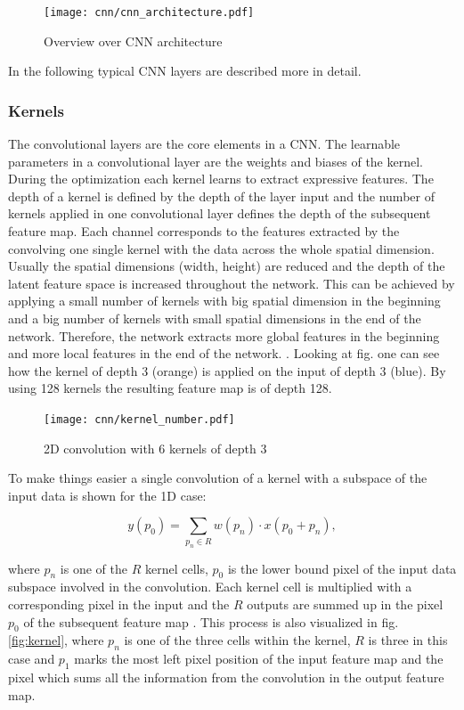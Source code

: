 \begin{figure}[htpb]
  \centering
  \texttt{[image: cnn/cnn\_architecture.pdf]}
  \caption {Overview over CNN architecture \cite{OShea2015}}
  \label{fig:CNN_overview}
\end{figure}

In the following typical CNN layers are described more in detail. 


\subsubsection{Kernels}
The convolutional layers are the core elements in a CNN. The learnable parameters in a convolutional layer are the weights and biases of the kernel. During the optimization each kernel learns to extract expressive features. The depth of a kernel is defined by the depth of the layer input and the number of kernels applied in one convolutional layer defines the depth of the subsequent feature map. Each channel corresponds to the features extracted by the convolving one single kernel with the data across the whole spatial dimension. Usually the spatial dimensions (width, height) are reduced and the depth of the latent feature space is increased throughout the network. This can be achieved by applying a small number of kernels with big spatial dimension in the beginning and a big number of kernels with small spatial dimensions in the end of the network. Therefore, the network extracts more global features in the beginning and more local features in the end of the network.  \cite{OShea2015}. Looking at fig. \label{fig:kernel_number} one can see how the kernel of depth 3 (orange) is applied on the input of depth 3 (blue). By using 128 kernels the resulting feature map is of depth 128.

\begin{figure}[htpb]
  \centering
  \texttt{[image: cnn/kernel\_number.pdf]}
  \caption {2D convolution with 6 kernels of depth 3 \cite{Ganesh2019}}
  \label{fig:kernel_number}
\end{figure}
\FloatBarrier 

To make things easier a single convolution of a kernel with a subspace of the input data is shown for the 1D case:

\begin{equation}
  y(p_{0}) = \sum_{p_{n} \in R} w(p_{n}) \cdot x(p_{0} + p_{n}), 
  \label{eq:kernel}
\end{equation}

where $p_{n}$ is one of the $R$ kernel cells, $p_{0}$ is the lower bound pixel of the input data subspace involved in the convolution. Each kernel cell is multiplied with a corresponding pixel in the input and the $R$ outputs are summed up in the pixel $p_{0}$ of the subsequent feature map \cite{Ganesh2019}. This process is also visualized in fig. \ref{fig:kernel}, where $p_{n}$ is one of the three cells within the kernel, $R$ is three in this case and $p_{1}$ marks the most left pixel position of the input feature map and the pixel which sums all the information from the convolution in the output feature map.


